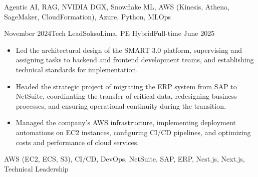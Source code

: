 \begin{experiences}
{{\begin{itemize}
      \end{itemize}
    }
  }
  {{Agentic AI}, RAG, {NVIDIA DGX}, Snowflake ML, {AWS (Kinesis, Athena, SageMaker, CloudFormation)}, Azure, Python, MLOps}

\experience
  {November 2024}{Tech Lead}{Sokso}{Lima, PE}
  {Hybrid}{Full-time}
  {June 2025} {
    \begin{itemize}
      \item Led the architectural design of the SMART 3.0 platform, supervising and assigning tasks to backend and frontend development teams, and establishing technical standards for implementation.
      \item Headed the strategic project of migrating the ERP system from SAP to NetSuite, coordinating the transfer of critical data, redesigning business processes, and ensuring operational continuity during the transition.
      \item Managed the company's AWS infrastructure, implementing deployment automations on EC2 instances, configuring CI/CD pipelines, and optimizing costs and performance of cloud services.
    \end{itemize}
  }
  {{AWS (EC2, ECS, S3)}, CI/CD, DevOps, NetSuite, SAP, ERP, Nest.js, Next.js, Technical Leadership}


\end{experiences}
